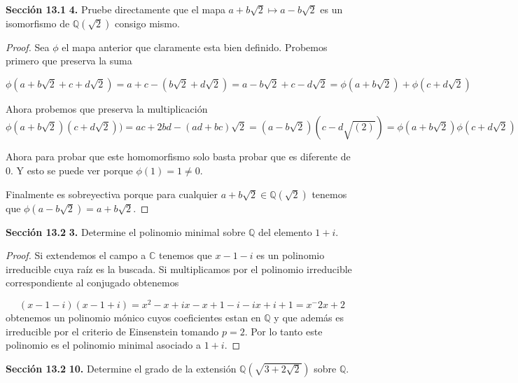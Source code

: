 \documentclass[letter,twoside,12pt]{article}
\begin{document}
\textbf{Sección 13.1} \textbf{4.} Pruebe directamente  que el mapa $ a+b\sqrt{2} \mapsto a-b\sqrt{2} $ es un isomorfismo de $ \mathbb{Q}(\sqrt{2}) $ consigo mismo.
\begin{proof}
Sea $ \phi $ el mapa anterior que claramente esta bien definido. Probemos primero que preserva la suma

\begin{equation}
\phi(a+b\sqrt{2}+c+d\sqrt{2})=a+c-(b\sqrt{2}+d\sqrt{2})=a-b\sqrt{2}+c-d\sqrt{2}=\phi(a+b\sqrt{2})+\phi(c+d\sqrt{2})\nonumber
\end{equation}

Ahora probemos que preserva la multiplicación
\begin{equation}
\phi(a+b\sqrt{2})(c+d\sqrt{2}))=ac+2bd-(ad+bc)\sqrt{2}=(a-b\sqrt{2})(c-d\sqrt{(2)})=\phi(a+b\sqrt{2})\phi(c+d\sqrt{2}) \nonumber
\end{equation}

Ahora para probar que este homomorfismo solo basta probar que es diferente de 0. Y esto se puede ver porque $ \phi(1)=1 \not = 0 $.

Finalmente es sobreyectiva porque para cualquier $ a+b\sqrt{2} \in \mathbb{Q}(\sqrt{2}) $ tenemos que $ \phi(a-b\sqrt{2})=a+b\sqrt{2} $.
\end{proof}

\textbf{Sección 13.2} \textbf{3.} Determine el polinomio minimal sobre $ \mathbb{Q} $ del elemento $ 1+i $.

\begin{proof}
Si extendemos el campo a $ \mathbb{C} $ tenemos que $ x-1-i $ es un polinomio irreducible cuya raíz es la buscada. Si multiplicamos por el polinomio irreducible correspondiente al conjugado obtenemos

\begin{equation}
(x-1-i)(x-1+i)=x^2-x+ix-x+1-i-ix+i+1=x^-2x+2 \nonumber
\end{equation}
obtenemos un polinomio mónico cuyos coeficientes estan en $ \mathbb{Q} $ y que además es irreducible por el criterio de Einsenstein tomando $ p=2 $. Por lo tanto este polinomio es el polinomio minimal asociado a $ 1+i $. 
\end{proof} 


\textbf{Sección 13.2} \textbf{10.} Determine el grado de la extensión $ \mathbb{Q}(\sqrt{3+2\sqrt{2}}) $ sobre $ \mathbb{Q} $.
\end{document}
